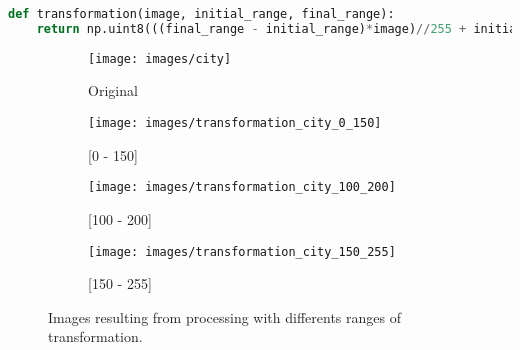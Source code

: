 \documentclass[journal]{IEEEtran}
\begin{document}
\begin{lstlisting}[language=Python, caption=Transformation function, label=list:trasnformation_function]
def transformation(image, initial_range, final_range):
	return np.uint8(((final_range - initial_range)*image)//255 + initial_range)
\end{lstlisting}

\begin{figure}
	\centering
	\begin{subfigure}{0.11\textwidth}
		\centering
		\texttt{[image: images/city]} 
		\caption{Original}
		\label{fig:transformation:original2}
	\end{subfigure}
	\centering
	\begin{subfigure}{0.11\textwidth}
		\centering
		\texttt{[image: images/transformation\_city\_0\_150]}
		\caption{[0 - 150]}
		\label{fig:transformation:0-150}
	\end{subfigure}
	\centering
	\begin{subfigure}{0.11\textwidth}
		\centering
		\texttt{[image: images/transformation\_city\_100\_200]}
		\caption{[100 - 200]}
		\label{fig:transformation:100-200}
	\end{subfigure}
	\centering
	\begin{subfigure}{0.11\textwidth}
		\centering
		\texttt{[image: images/transformation\_city\_150\_255]}
		\caption{[150 - 255]}
		\label{fig:transformation:150-255}
	\end{subfigure}
	
	\caption{Images resulting from processing with differents ranges of transformation.}
	\label{fig:transformation:results}
\end{figure}
\end{document}

